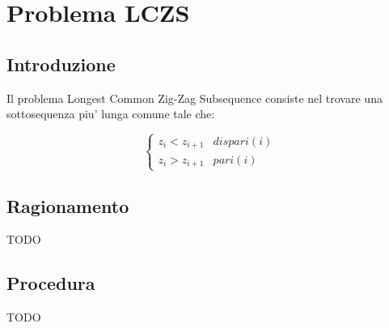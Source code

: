 \chapter{Problema LCZS}

\section{Introduzione}

Il problema Longest Common Zig-Zag Subsequence consiste nel trovare una sottosequenza piu' lunga comune tale che:

\[
    \begin{cases}
        \text{$z_i < z_{i+1}$} & \text{$dispari(i)$} \\
        \text{$z_i > z_{i+1}$} & \text{$pari(i)$}
    \end{cases}
\]

\section{Ragionamento}

TODO

\section{Procedura}

TODO